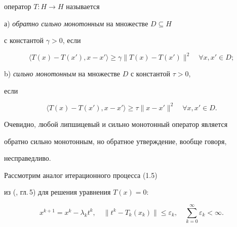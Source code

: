 оператор $T: H \rightarrow H$ называется 





а) {\em обратно сильно монотонным} на множестве $D \subseteq H$


с константой $\gamma > 0$, если


$$


\langle T(x) - T(x'), x-x' \rangle \geq


\gamma \| T(x) - T(x') \|^2 \quad \forall x, x' \in D;


$$





b) {\em сильно монотонным} на множестве $D$ с константой $\tau > 0$,


если


$$


\langle T(x)-T(x'), x-x' \rangle\geq\tau\|x-x'\|^2 \quad \forall x, x' \in D.


$$


Очевидно, любой липшицевый и сильно монотонный оператор является 


обратно сильно монотонным, но обратное утверждение, вообще говоря, 


несправедливо.





Рассмотрим аналог итерационного процесса (1.5)


из (\cite{GT89}, гл.\,5) для решения уравнения $T(x){=}0$:


\begin{equation} \label{eq:2.4} 


x^{k+1}=x^{k}-\lambda_{k} t^{k},\quad


\| t^{k} - T_{k} (x_{k}) \| \leq \varepsilon_{k}, \quad 


\sum_{k=0}^{\infty} \varepsilon_{k} < \infty .


\end{equation}





